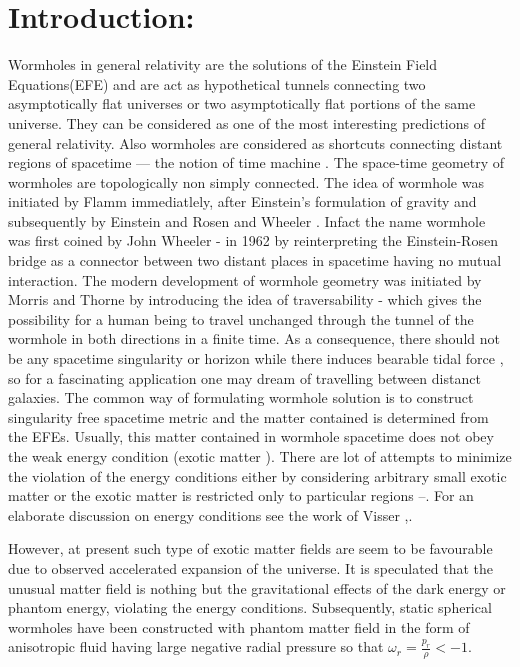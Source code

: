 \documentclass[10pt]{revtex4}
\begin{document}
\section{Introduction:}
Wormholes in general relativity are the solutions of the Einstein Field Equations(EFE) and are act as hypothetical tunnels connecting \cite{r1} two asymptotically flat universes or two asymptotically flat portions of the same universe. They can be considered as one of the most interesting predictions of general relativity. Also wormholes are considered as shortcuts connecting distant regions of spacetime --- the notion of time machine \cite{r2.1}. The space-time geometry of wormholes are topologically non simply connected. The idea of wormhole was initiated by Flamm \cite{r2} immediatlely, after Einstein's formulation of gravity  and subsequently by Einstein and Rosen \cite{r3} and Wheeler \cite{r4}. Infact the name wormhole was first coined by John Wheeler {\cite{r4}-\cite{r5}} in 1962 by reinterpreting the Einstein-Rosen bridge \cite{r3} as a connector between two distant places in spacetime having no mutual interaction. The modern development of wormhole geometry was initiated by Morris and Thorne \cite{r6} by introducing the idea of traversability {\cite{r7}-\cite{r8.1}} which gives the possibility for a human being to travel unchanged through the tunnel of the wormhole in both directions in a finite time. As a consequence, there should not be any spacetime singularity \cite{r9} or horizon while there induces bearable tidal force \cite{r10}, so for a fascinating application one may dream of travelling between distanct galaxies. The common way of formulating wormhole solution is to construct singularity free spacetime metric and the matter contained is determined from the EFEs. Usually, this matter contained in wormhole spacetime does not obey the weak energy condition (exotic matter \cite{r10.1}). There are lot of attempts to minimize the violation of the energy conditions either by considering arbitrary small exotic matter or the exotic matter is restricted only to particular regions {\cite{r11}--\cite{r13}}. For an elaborate discussion on energy conditions see the work of Visser {\cite{r1},\cite{r11}}.\par
However, at present such type of exotic matter fields are seem to be favourable due to observed accelerated expansion of the universe. It is speculated that the unusual matter field is nothing but the gravitational effects of the dark energy or phantom energy, violating the energy conditions. Subsequently, static spherical wormholes have been constructed \cite{r14} with phantom matter field in the form of anisotropic fluid having large negative radial pressure so that $\omega_r=\frac{p_r}{\rho}<-1.$ \par
\end{document}
